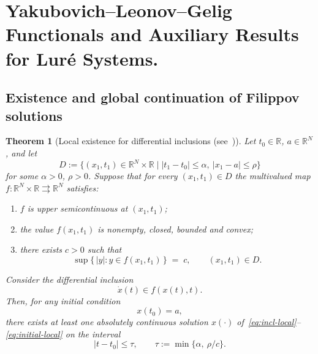 \documentclass[journal]{IEEEtran}
\newtheorem{theorem}{Theorem}
\begin{document}
\printbibliography 

\newpage
\appendices

\section{Yakubovich--Leonov--Gelig Functionals and Auxiliary Results for Lur\'e Systems.} \label{app:YLG}


\subsection{Existence and global continuation of Filippov solutions}

\begin{theorem}[Local existence for differential inclusions (see~{\cite[Thm.~1.1]{YLG}})]
Let $t_0\in\mathbb{R}$, $a\in\mathbb{R}^N$, and let
\[
D := \bigl\{(x_1,t_1)\in\mathbb{R}^N\times\mathbb{R}
       \;\big|\; |t_1-t_0|\le \alpha,\ |x_1-a|\le\rho \bigr\}
\]
for some $\alpha>0$, $\rho>0$.
Suppose that for every $(x_1,t_1)\in D$ the multivalued map
$f:\mathbb{R}^N\times\mathbb{R}\rightrightarrows\mathbb{R}^N$
satisfies:
\begin{enumerate}
  \item $f$ is upper semicontinuous at $(x_1,t_1)$;
  \item the value $f(x_1,t_1)$ is nonempty, closed, bounded and convex;
  \item there exists $c>0$ such that
        \begin{equation}\label{eq:f-bound-local}
           \sup\{\,|y| : y\in f(x_1,t_1)\,\} \;=\; c,
           \qquad (x_1,t_1)\in D .
        \end{equation}
\end{enumerate}
Consider the differential inclusion
\begin{equation}\label{eq:incl-local}
   \dot x(t) \in f(x(t),t).
\end{equation}
Then, for any initial condition
\begin{equation}\label{eq:initial-local}
   x(t_0) = a,
\end{equation}
there exists at least one absolutely continuous solution $x(\cdot)$
of~\eqref{eq:incl-local}--\eqref{eq:initial-local}
on the interval
\[
   |t-t_0|\le\tau, \qquad
   \tau := \min\{\alpha,\ \rho/c\}.
\]
\end{theorem}
\end{document}
